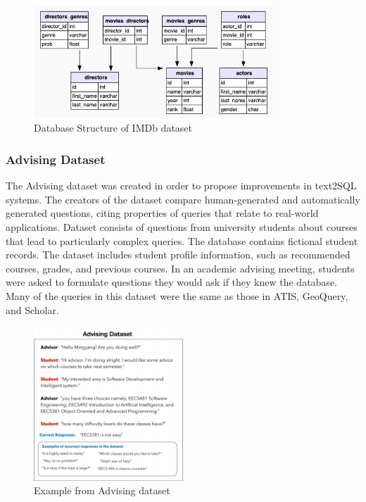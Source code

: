 \begin{figure}[htb]
    \centering
    \includegraphics[width=0.8\textwidth]{pics/db/IMDb.png}
    \caption{Database Structure of IMDb dataset}
    \label{fig:IMDb}
\end{figure}

\newpage %

\subsubsection{Advising Dataset}

The Advising dataset was created in order to propose improvements in text2SQL systems. The creators of the dataset compare human-generated and automatically generated questions, citing properties of queries that relate to real-world applications. Dataset consists of questions from university students about courses that lead to particularly complex queries. The database contains fictional student records. The dataset includes student profile information, such as recommended courses, grades, and previous courses. In an academic advising meeting, students were asked to formulate questions they would ask if they knew the database. Many of the queries in this dataset were the same as those in ATIS, GeoQuery, and Scholar.

\begin{figure}[htb]
    \centering
    \includegraphics[width=0.5\textwidth]{pics/db/Advising.png}
    \caption{Example from Advising dataset \cite{vig_comparison_2019}}
    \label{fig:Advising}
\end{figure}

